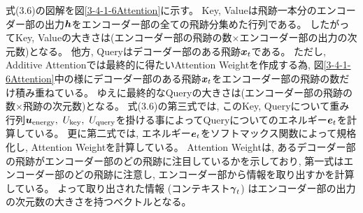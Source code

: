 式(3.6)の図解を図\ref{3-4-1-6Attention}に示す。
Key, Valueは飛跡一本分のエンコーダー部の出力${\mbox{\boldmath{$h$}}}$をエンコーダー部の全ての飛跡分集めた行列である。
したがってKey, Valueの大きさは(エンコーダー部の飛跡の数$\times$エンコーダー部の出力の次元数)となる。
他方, Queryはデコーダー部のある飛跡${\mbox{\boldmath{$x$}}}_{t}$である。
ただし, Additive Attentionでは最終的に得たいAttention Weightを作成する為, 図\ref{3-4-1-6Attention}中の様にデコーダー部のある飛跡${\mbox{\boldmath{$x$}}}_{t}$をエンコーダー部の飛跡の数だけ積み重ねている。
ゆえに最終的なQueryの大きさは(エンコーダー部の飛跡の数$\times$飛跡の次元数)となる。
式(3.6)の第三式では, このKey, Queryについて重み行列${\mbox{\boldmath{$u$}}}_{\rm energy},\  U_{\rm key},\ U_{\rm query}$を掛ける事によってQueryについてのエネルギー${\mbox{\boldmath{$e$}}}_{t}$を計算している。
更に第二式では, エネルギー${\mbox{\boldmath{$e$}}}_{t}$をソフトマックス関数によって規格化し, Attention Weightを計算している。
Attention Weightは, あるデコーダー部の飛跡がエンコーダー部のどの飛跡に注目しているかを示しており, 第一式はエンコーダー部のどの飛跡に注意し, エンコーダー部から情報を取り出すかを計算している。
よって取り出された情報 (コンテキスト${\mbox{\boldmath{$\gamma$}}}_{t}$) はエンコーダー部の出力の次元数の大きさを持つベクトルとなる。

